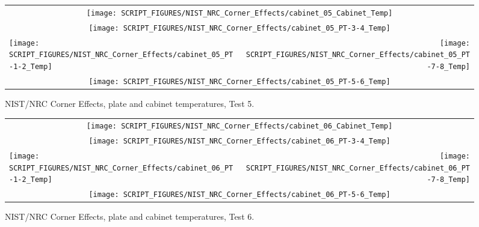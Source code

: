 \begin{figure}[p]
\begin{tabular*}{\textwidth}{l@{\extracolsep{\fill}}r}
\multicolumn{2}{c}{\texttt{[image: SCRIPT\_FIGURES/NIST\_NRC\_Corner\_Effects/cabinet\_05\_Cabinet\_Temp]}} \\
\multicolumn{2}{c}{\texttt{[image: SCRIPT\_FIGURES/NIST\_NRC\_Corner\_Effects/cabinet\_05\_PT-3-4\_Temp]}} \\
\texttt{[image: SCRIPT\_FIGURES/NIST\_NRC\_Corner\_Effects/cabinet\_05\_PT-1-2\_Temp]} &
\texttt{[image: SCRIPT\_FIGURES/NIST\_NRC\_Corner\_Effects/cabinet\_05\_PT-7-8\_Temp]} \\
\multicolumn{2}{c}{\texttt{[image: SCRIPT\_FIGURES/NIST\_NRC\_Corner\_Effects/cabinet\_05\_PT-5-6\_Temp]}}
\end{tabular*}
\caption[NIST/NRC Corner Effects, plate and cabinet temperatures, Test 5]{NIST/NRC Corner Effects, plate and cabinet temperatures, Test 5.}
\label{NIST_NRC_Cabinet_PT_Test_5}
\end{figure}

\begin{figure}[p]
\begin{tabular*}{\textwidth}{l@{\extracolsep{\fill}}r}
\multicolumn{2}{c}{\texttt{[image: SCRIPT\_FIGURES/NIST\_NRC\_Corner\_Effects/cabinet\_06\_Cabinet\_Temp]}} \\
\multicolumn{2}{c}{\texttt{[image: SCRIPT\_FIGURES/NIST\_NRC\_Corner\_Effects/cabinet\_06\_PT-3-4\_Temp]}} \\
\texttt{[image: SCRIPT\_FIGURES/NIST\_NRC\_Corner\_Effects/cabinet\_06\_PT-1-2\_Temp]} &
\texttt{[image: SCRIPT\_FIGURES/NIST\_NRC\_Corner\_Effects/cabinet\_06\_PT-7-8\_Temp]} \\
\multicolumn{2}{c}{\texttt{[image: SCRIPT\_FIGURES/NIST\_NRC\_Corner\_Effects/cabinet\_06\_PT-5-6\_Temp]}}
\end{tabular*}
\caption[NIST/NRC Corner Effects, plate and cabinet temperatures, Test 6]{NIST/NRC Corner Effects, plate and cabinet temperatures, Test 6.}
\label{NIST_NRC_Cabinet_PT_Test_6}
\end{figure}

